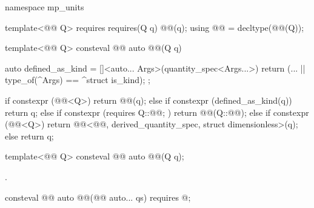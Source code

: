 \begin{codeblock}
namespace mp_units {

template<@@ Q>
  requires requires(Q q) { @@(q); }
using @@ = decltype(@@(Q{}));

template<@@ Q>
consteval @@ auto @@(Q q)
{
  auto defined_as_kind = []<auto... Args>(quantity_spec<Args...>) {
    return (... || type_of(^Args) == ^struct is_kind);
  };

  if constexpr (@@<Q>) {
    return @@(q);
  } else if constexpr (defined_as_kind(q)) {
    return q;
  } else if constexpr (requires { Q::@@; }) {
    return @@(Q::@@);
  } else if constexpr (@@<Q>) {
    return @@<@@, derived_quantity_spec, struct dimensionless>(q);
  } else {
    return q;
  }
}

}
\end{codeblock}

\begin{itemdecl}
template<@@ Q>
consteval @@ auto @@(Q q);
\end{itemdecl}

\begin{itemdescr}
\pnum
\returns
{}.
\end{itemdescr}

\begin{itemdecl}
consteval @@ auto @@(@@ auto... qs)
  requires @\seebelownc@;
\end{itemdecl}

